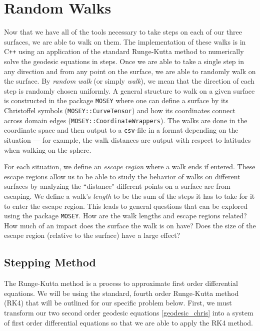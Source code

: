\documentclass{article}
\begin{document}
\section{Random Walks}
	Now that we have all of the tools necessary to take steps on each of our three surfaces, we are able to walk on them.
	The implementation of these walks is in C\texttt{++} using an application of the standard Runge-Kutta method to numerically solve the geodesic equations in steps.
	Once we are able to take a single step in any direction and from any point on the surface, we are able to randomly walk on the surface.
	By \textit{random walk} (or simply \textit{walk}), we mean that the direction of each step is randomly chosen uniformly.
	A general structure to walk on a given surface is constructed in the package \texttt{MOSEY} where one can define a surface by its Christoffel symbols (\texttt{MOSEY::CurveTensor}) and how its coordinates connect across domain edges (\texttt{MOSEY::CoordinateWrappers}).
	The walks are done in the coordinate space and then output to a \texttt{csv}-file in a format depending on the situation --- for example, the walk distances are output with respect to latitudes when walking on the sphere.
	
	For each situation, we define an \textit{escape region} where a walk ends if entered.
	These escape regions allow us to be able to study the behavior of walks on different surfaces by analyzing the ``distance" different points on a surface are from escaping.
	We define a walk's \textit{length} to be the sum of the steps it has to take for it to enter the escape region.
	This leads to general questions that can be explored using the package \texttt{MOSEY}.
	How are the walk lengths and escape regions related?
	How much of an impact does the surface the walk is on have?
	Does the size of the escape region (relative to the surface) have a large effect?
	
	\subsection{Stepping Method}
		The Runge-Kutta method is a process to approximate first order differential equations.
		We will be using the standard, fourth order Runge-Kutta method (RK4) that will be outlined for our specific problem below.
		First, we must transform our two second order geodesic equations \ref{geodesic_chris} into a system of first order differential equations so that we are able to apply the RK4 method.
		
\end{document}
